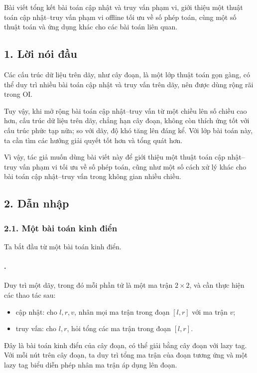 \documentclass[11pt]{article}
\begin{document}
Bài viết tổng kết bài toán cập nhật và truy vấn phạm vi, giới thiệu một thuật
toán cập nhật--truy vấn phạm vi offline tối ưu về số phép toán, cùng một số
thuật toán và ứng dụng khác cho các bài toán liên quan.

\subsection*{1. Lời nói đầu}

Các cấu trúc dữ liệu trên dãy, như cây đoạn, là một lớp thuật toán gọn gàng,
có thể duy trì nhiều bài toán cập nhật và truy vấn trên dãy, nên được dùng
rộng rãi trong OI.

Tuy vậy, khi mở rộng bài toán cập nhật--truy vấn từ một chiều lên số chiều cao
hơn, cấu trúc dữ liệu trên dãy, chẳng hạn cây đoạn, không còn thích ứng tốt
với cấu trúc phức tạp nữa; so với dãy, độ khó tăng lên đáng kể. Với lớp bài
toán này, ta cần tìm các hướng giải quyết tốt hơn và tổng quát hơn.

Vì vậy, tác giả muốn dùng bài viết này để giới thiệu một thuật toán
cập nhật--truy vấn phạm vi tối ưu về số phép toán, cũng như một số cách xử lý
khác cho bài toán cập nhật--truy vấn trong không gian nhiều chiều.

\subsection*{2. Dẫn nhập}

\subsubsection*{2.1. Một bài toán kinh điển}

Ta bắt đầu từ một bài toán kinh điển.

\paragraph{.}
Duy trì một dãy, trong đó mỗi phần tử là một ma trận \(2\times 2\), và cần
thực hiện các thao tác sau:
\begin{itemize}
  \item cập nhật: cho \(l,r,v\), nhân mọi ma trận trong đoạn \([l,r]\) với ma
  trận \(v\);
  \item truy vấn: cho \(l,r\), hỏi tổng các ma trận trong đoạn \([l,r]\).
\end{itemize}

Đây là bài toán kinh điển của cây đoạn, có thể giải bằng cây đoạn với lazy
tag. Với mỗi nút trên cây đoạn, ta duy trì tổng ma trận của đoạn tương ứng và
một lazy tag biểu diễn phép nhân ma trận áp dụng lên đoạn.
\end{document}
